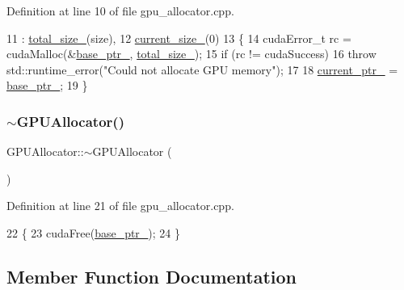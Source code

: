 Definition at line 10 of file gpu\+\_\+allocator.\+cpp.


\begin{DoxyCode}
11     : \mbox{\hyperlink{class_g_p_u_allocator_a629bd3cca49d00f82cd6538e0d07d4ae}{total\_size\_}}(size),
12       \mbox{\hyperlink{class_g_p_u_allocator_a8d404f40928c431ced08c013189c8c58}{current\_size\_}}(0)
13 \{
14     cudaError\_t rc = cudaMalloc(&\mbox{\hyperlink{class_g_p_u_allocator_a3c2b70c86a428b4265771f9845307d0a}{base\_ptr\_}}, \mbox{\hyperlink{class_g_p_u_allocator_a629bd3cca49d00f82cd6538e0d07d4ae}{total\_size\_}});
15     \textcolor{keywordflow}{if} (rc != cudaSuccess)
16         \textcolor{keywordflow}{throw} std::runtime\_error(\textcolor{stringliteral}{"Could not allocate GPU memory"});
17 
18     \mbox{\hyperlink{class_g_p_u_allocator_a34ef0b84f1e5a510c4c968889b2dbf04}{current\_ptr\_}} = \mbox{\hyperlink{class_g_p_u_allocator_a3c2b70c86a428b4265771f9845307d0a}{base\_ptr\_}};
19 \}
\end{DoxyCode}
\mbox{\label{class_g_p_u_allocator_aacf971bf00e58690d44a52b9649d6e8d}} 
\subsubsection{\texorpdfstring{$\sim$\+G\+P\+U\+Allocator()}{~GPUAllocator()}}
{\footnotesize\ttfamily G\+P\+U\+Allocator\+::$\sim$\+G\+P\+U\+Allocator (\begin{DoxyParamCaption}{ }\end{DoxyParamCaption})}



Definition at line 21 of file gpu\+\_\+allocator.\+cpp.


\begin{DoxyCode}
22 \{
23     cudaFree(\mbox{\hyperlink{class_g_p_u_allocator_a3c2b70c86a428b4265771f9845307d0a}{base\_ptr\_}});
24 \}
\end{DoxyCode}


\subsection{Member Function Documentation}
\mbox{\label{class_g_p_u_allocator_abe0cecfd551e4824ed5522721dea76ca}} 
